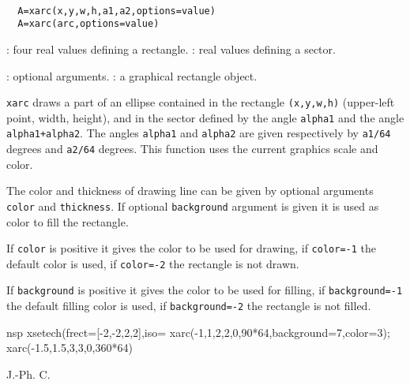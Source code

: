 \begin{mandesc}
   \\ %
\end{mandesc}
\begin{calling_sequence}
\begin{verbatim}
  A=xarc(x,y,w,h,a1,a2,options=value)
  A=xarc(arc,options=value)
\end{verbatim}
\end{calling_sequence}
\begin{parameters}
  \begin{varlist}
    : four real values defining a rectangle.
    : real values defining a sector.
    
    : optional arguments.
    : a graphical rectangle object.
  \end{varlist}
\end{parameters}

\begin{mandescription}
  \verb!xarc! draws a part of an ellipse contained in the rectangle 
  \verb!(x,y,w,h)! (upper-left point, width, height), and in the sector 
  defined by the angle \verb!alpha1! and the angle \verb!alpha1+alpha2!. 
  The angles \verb!alpha1! and \verb!alpha2! are 
  given respectively by \verb!a1/64! degrees and \verb!a2/64! degrees.
  This function uses the current graphics scale and color.

  The color and thickness of drawing line can be given by optional arguments
  \verb!color! and \verb!thickness!. If optional \verb!background!
  argument is given it is used as color to fill the rectangle.

  If \verb!color! is positive it gives the color to be used for drawing,
  if \verb!color=-1! the default color is used, if  \verb!color=-2! the
  rectangle is not drawn.

  If \verb!background! is positive it gives the color to be used for filling,
  if \verb!background=-1! the default filling color is used,
  if  \verb!background=-2! the rectangle is not filled.
\end{mandescription}

\begin{examples}
  \begin{mintednsp}{nsp}
    xsetech(frect=[-2,-2,2,2],iso=%
    xarc(-1,1,2,2,0,90*64,background=7,color=3);
    xarc(-1.5,1.5,3,3,0,360*64)
  \end{mintednsp}
\end{examples}
\begin{manseealso}
     
\end{manseealso}
\begin{authors}
  J.-Ph. C.  
\end{authors}

